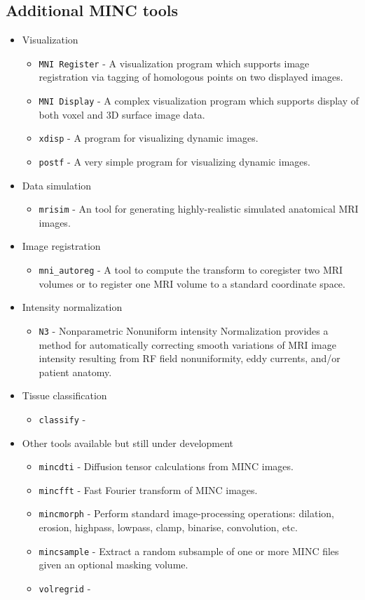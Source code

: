 \documentclass{article}
\begin{document}
\subsection{Additional MINC tools}
\begin{itemize}
\item Visualization
\begin{itemize}
\item {\tt MNI Register} - A visualization program which supports image
 registration via tagging of homologous points on two displayed images.
\item {\tt MNI Display} - A complex visualization program which supports
display of both voxel and 3D surface image data.
\item {\tt xdisp} - A program for visualizing dynamic images.
\item {\tt postf} - A very simple program for visualizing dynamic images.
\end{itemize}
\item Data simulation
\begin{itemize}
\item {\tt mrisim} - An tool for generating highly-realistic simulated
  anatomical MRI images.
\end{itemize}
\item Image registration
\begin{itemize}
\item {\tt mni\_autoreg} - A tool to compute the transform to coregister two
 MRI volumes or to register one MRI volume to a standard coordinate
 space.
\end{itemize}
\item Intensity normalization
\begin{itemize}
\item {\tt N3} - Nonparametric Nonuniform intensity Normalization provides a
  method for automatically correcting smooth variations of MRI image
  intensity resulting from RF field nonuniformity, eddy currents, and/or
  patient anatomy.
\end{itemize}
\item Tissue classification
\begin{itemize}
\item {\tt classify} - 
\end{itemize}
\item Other tools available but still under development
\begin{itemize}
\item {\tt mincdti} - Diffusion tensor calculations from MINC images.
\item {\tt mincfft} - Fast Fourier transform of MINC images.
\item {\tt mincmorph} - Perform standard image-processing operations:
  dilation, erosion, highpass, lowpass, clamp, binarise, convolution,
  etc.
\item {\tt mincsample} - Extract a random subsample of one or more MINC files
given an optional masking volume.
\item {\tt volregrid} - 
\end{itemize}
\end{itemize}
\end{document}
